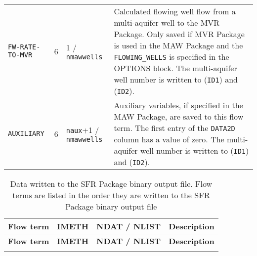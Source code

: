 \begin{longtable}{p{3.5cm} p{2cm} p{3.5cm} p{6.5cm}}
\texttt{FW-RATE-TO-MVR} & 6 & 1 / \texttt{nmawwells} & Calculated flowing well flow from a multi-aquifer well to the MVR Package. Only saved if MVR Package is used in the MAW Package and the \texttt{FLOWING\_WELLS} is specified in the OPTIONS block. The multi-aquifer well number is written to (\texttt{ID1}) and (\texttt{ID2}). \\
\texttt{AUXILIARY} & 6 & \texttt{naux}+1 / \texttt{nmawwells} & Auxiliary variables, if specified in the MAW Package, are saved to this flow term. The first entry of the \texttt{DATA2D} column has a value of zero. The multi-aquifer well number is written to (\texttt{ID1}) and (\texttt{ID2}).
\label{table:binarymaw}
\end{longtable}


\newpage
\begin{longtable}{p{3.5cm} p{2cm} p{3.5cm} p{6.5cm}}
\caption{Data written to the SFR Package binary output file. Flow terms are listed in the order they are written to the SFR Package binary output file} \tabularnewline
\hline
\hline
\textbf{Flow term} & \textbf{IMETH} & \textbf{NDAT / NLIST} & \textbf{Description} \\
\hline
\endfirsthead

\hline
\hline
\textbf{Flow term} & \textbf{IMETH} & \textbf{NDAT / NLIST} & \textbf{Description} \\
\hline
\endhead

\hline
\endfoot


\end{longtable}
